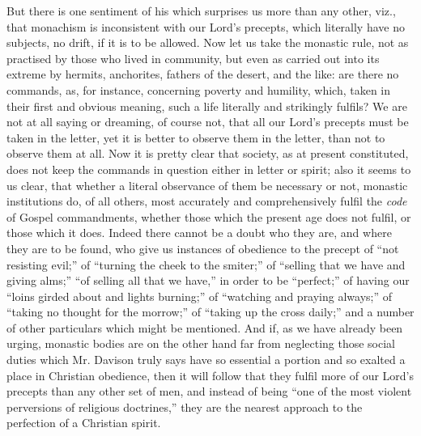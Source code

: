 But there is one sentiment of his which surprises
us more than any other, viz., that monachism is inconsistent with our
Lord's precepts, which literally have no subjects, no drift, if it is
to be allowed. Now let us take the monastic rule, not as practised by
those who lived in community, but even as carried out into its extreme
by hermits, anchorites, fathers of the desert, and the like: are there
no commands, as, for instance, concerning poverty and humility, which,
taken in their first and obvious meaning, such a life literally and
strikingly fulfils? We are not at all saying or dreaming, of course
not, that all our Lord's precepts must be taken in the letter, yet it
is better to observe them in the letter, than not to observe them at
all. Now it is pretty clear that society, as at present
constituted, does not keep the commands in question either in letter
or spirit; also it seems to us clear, that whether a literal
observance of them be necessary or not, monastic institutions do, of
all others, most accurately and comprehensively fulfil the \emph{code}
of Gospel commandments, whether those which the present age does not
fulfil, or those which it does. Indeed there cannot be a doubt who
they are, and where they are to be found, who give us instances of
obedience to the precept of ``not resisting evil;'' of ``turning the
cheek to the smiter;'' of ``selling that we have and giving alms;'' ``of
selling all that we have,'' in order to be ``perfect;'' of having our ``loins
girded about and lights burning;'' of ``watching and praying always;'' of
``taking no thought for the morrow;'' of ``taking up the cross daily;''
and a number of other particulars which might be mentioned. And if, as
we have already been urging, monastic bodies are on the other hand far
from neglecting those social duties which Mr. Davison truly says have
so essential a portion and so exalted a place in Christian obedience,
then it will follow that they fulfil more of our Lord's precepts than
any other set of men, and instead of being ``one of the most violent
perversions of religious doctrines,'' they are the nearest approach to
the perfection of a Christian spirit.

